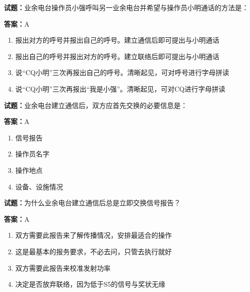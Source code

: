 \documentclass{ctexbook}
\begin{document}
\textbf{试题：}业余电台操作员小强呼叫另一业余电台并希望与操作员小明通话的方法是： 

\textbf{答案：}A 

\begin{enumerate}[leftmargin=3em]
  \item 报出对方的呼号并报出自己的呼号。建立通信后即可提出与小明通话 

  \item 报出自己的呼号并报出对方的呼号。建立联络后即可提出与小明通话 

  \item 说“CQ小明”三次再报出自己的呼号。清晰起见，可对呼号进行字母拼读 

  \item 说“CQ小明”三次再报出“我是小强”。清晰起见，可对CQ进行字母拼读 

\end{enumerate}





\vspace{1em}

\textbf{试题：}业余电台建立通信后，双方应首先交换的必要信息是： 

\textbf{答案：}A 

\begin{enumerate}[leftmargin=3em]
  \item 信号报告 

  \item 操作员名字 

  \item 操作地点 

  \item 设备、设施情况 

\end{enumerate}





\vspace{1em}

\textbf{试题：}为什么业余电台建立通信后总是立即交换信号报告？ 

\textbf{答案：}A 

\begin{enumerate}[leftmargin=3em]
  \item 双方需要此报告来了解传播情况，安排最适合的操作 

  \item 这是最基本的报务要求，不必去问，只管去执行就好 

  \item 双方需要此报告来校准发射功率 

  \item 决定是否放弃联络，因为低于S5的信号与奖状无缘 

\end{enumerate}
\end{document}
